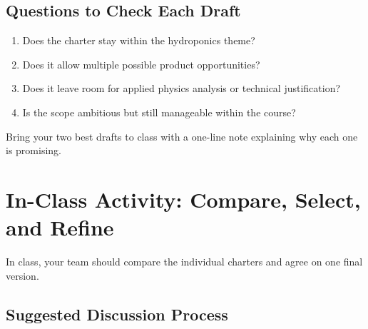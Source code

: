 \subsection{Questions to Check Each Draft}
\begin{enumerate}
    \item Does the charter stay within the hydroponics theme?
    \item Does it allow multiple possible product opportunities?
    \item Does it leave room for applied physics analysis or technical justification?
    \item Is the scope ambitious but still manageable within the course?
\end{enumerate}

Bring your two best drafts to class with a one-line note explaining why each one is promising.

\section{In-Class Activity: Compare, Select, and Refine}

In class, your team should compare the individual charters and agree on one final version.

\subsection{Suggested Discussion Process}






